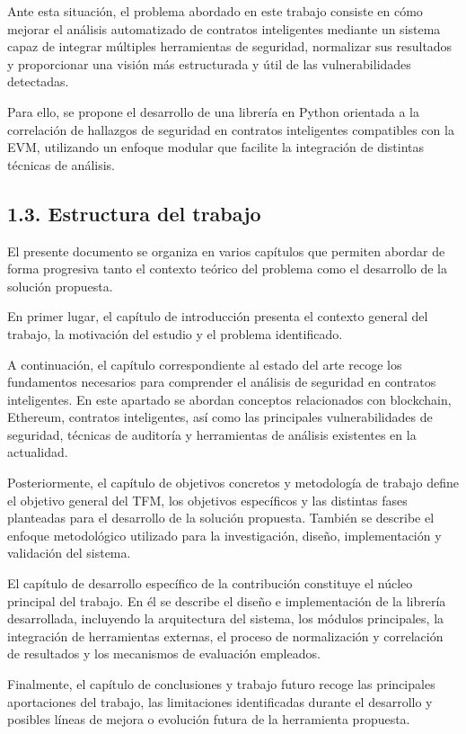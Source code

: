 Ante esta situación, el problema abordado en este trabajo consiste en
cómo mejorar el análisis automatizado de contratos inteligentes mediante
un sistema capaz de integrar múltiples herramientas de seguridad,
normalizar sus resultados y proporcionar una visión más estructurada y
útil de las vulnerabilidades detectadas.

Para ello, se propone el desarrollo de una librería en Python orientada
a la correlación de hallazgos de seguridad en contratos inteligentes
compatibles con la EVM, utilizando un enfoque modular que facilite la
integración de distintas técnicas de análisis.

\subsection{1.3. Estructura del trabajo}\label{estructura-del-trabajo}

El presente documento se organiza en varios capítulos que permiten
abordar de forma progresiva tanto el contexto teórico del problema como
el desarrollo de la solución propuesta.

En primer lugar, el capítulo de introducción presenta el contexto
general del trabajo, la motivación del estudio y el problema
identificado.

A continuación, el capítulo correspondiente al estado del arte recoge
los fundamentos necesarios para comprender el análisis de seguridad en
contratos inteligentes. En este apartado se abordan conceptos
relacionados con blockchain, Ethereum, contratos inteligentes, así como
las principales vulnerabilidades de seguridad, técnicas de auditoría y
herramientas de análisis existentes en la actualidad.

Posteriormente, el capítulo de objetivos concretos y metodología de
trabajo define el objetivo general del TFM, los objetivos específicos y
las distintas fases planteadas para el desarrollo de la solución
propuesta. También se describe el enfoque metodológico utilizado para la
investigación, diseño, implementación y validación del sistema.

El capítulo de desarrollo específico de la contribución constituye el
núcleo principal del trabajo. En él se describe el diseño e
implementación de la librería desarrollada, incluyendo la arquitectura
del sistema, los módulos principales, la integración de herramientas
externas, el proceso de normalización y correlación de resultados y los
mecanismos de evaluación empleados.

Finalmente, el capítulo de conclusiones y trabajo futuro recoge las
principales aportaciones del trabajo, las limitaciones identificadas
durante el desarrollo y posibles líneas de mejora o evolución futura de
la herramienta propuesta.
